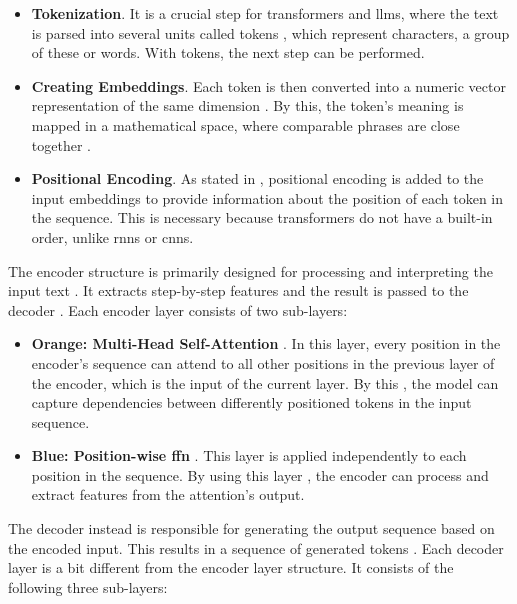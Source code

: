 \begin{itemize}
   \item \textbf{Tokenization}. It is a crucial step for transformers and \acp{llm}, where the text is parsed into several units called tokens \cite{naveed_comprehensive_2024,raiaan_review_2024,zhao_survey_2025,naik_large_2024}, which represent characters, a group of these or words. With tokens, the next step can be performed.
   \item \textbf{Creating Embeddings}. Each token is then converted into a numeric vector representation of the same dimension \cite{vaswani_attention_2017}. By this, the token's meaning is mapped in a mathematical space, where comparable phrases are close together \cite{raiaan_review_2024}. 
   \item \textbf{Positional Encoding}. As stated in \cite{vaswani_attention_2017}, positional encoding is added to the input embeddings to provide information about the position of each token in the sequence. This is necessary because transformers do not have a built-in order, unlike \acp{rnn} or \acp{cnn}. 
\end{itemize}

 The encoder structure is primarily designed for processing and interpreting the input text \cite{wang_history_2024}. It extracts step-by-step features and the result is passed to the decoder \cite{liu_understanding_2025}. Each encoder layer consists of two sub-layers: 

\begin{itemize}
    \item \textbf{Orange: Multi-Head Self-Attention} \cite{vaswani_attention_2017}. In this layer, every position in the encoder's sequence can attend to all other positions in the previous layer of the encoder, which is the input of the current layer. By this \cite{liu_understanding_2025}, the model can capture dependencies between differently positioned tokens in the input sequence. 
    \item \textbf{Blue: Position-wise \ac{ffn}} \cite{vaswani_attention_2017}. This layer is applied independently to each position in the sequence. By using this layer \cite{liu_understanding_2025}, the encoder can process and extract features from the attention's output.
\end{itemize}

 The decoder instead is responsible for generating the output sequence based on the encoded input. This results in a sequence of generated tokens \cite{raiaan_review_2024}. Each decoder layer is a bit different from the encoder layer structure. It consists of the following three sub-layers:

